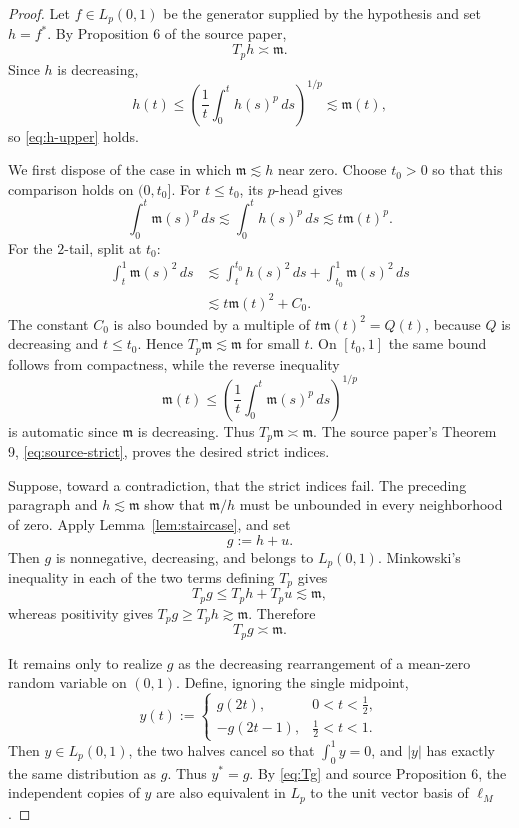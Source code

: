 \documentclass[11pt]{article}
\theoremstyle{definition}
\theoremstyle{remark}
\newcommand{\Tp}{T_p}
\newcommand{\mfun}{\mathfrak m}
\newcommand{\lesssimc}{\mathrel{\lesssim}}
\newcommand{\gtrsimc}{\mathrel{\gtrsim}}
\newcommand{\asympc}{\mathrel{\asymp}}
\newcommand{\Lp}{L_p(0,1)}
\begin{document}
\begin{proof}
Let $f\in\Lp$ be the generator supplied by the hypothesis and set $h=f^*$.
By Proposition 6 of the source paper,
\begin{equation}\label{eq:Th}
  \Tp h\asympc\mfun.
\end{equation}
Since $h$ is decreasing,
\[
  h(t)\leq
  \left(\frac1t\int_0^t h(s)^p\,ds\right)^{1/p}
  \lesssimc\mfun(t),
\]
so \eqref{eq:h-upper} holds.

We first dispose of the case in which $\mfun\lesssimc h$ near zero.  Choose
$t_0>0$ so that this comparison holds on $(0,t_0]$.  For $t\leq t_0$, its
$p$-head gives
\[
  \int_0^t\mfun(s)^p\,ds
  \lesssimc\int_0^t h(s)^p\,ds
  \lesssimc t\mfun(t)^p.
\]
For the $2$-tail, split at $t_0$:
\begin{align*}
  \int_t^1\mfun(s)^2\,ds
  &\lesssimc \int_t^{t_0}h(s)^2\,ds
    +\int_{t_0}^1\mfun(s)^2\,ds\\
  &\lesssimc t\mfun(t)^2+C_0.
\end{align*}
The constant $C_0$ is also bounded by a multiple of $t\mfun(t)^2=Q(t)$,
because $Q$ is decreasing and $t\leq t_0$.  Hence
$\Tp\mfun\lesssimc\mfun$ for small $t$.  On $[t_0,1]$ the same bound follows
from compactness, while the reverse inequality
\[
  \mfun(t)\leq
  \left(\frac1t\int_0^t\mfun(s)^p\,ds\right)^{1/p}
\]
is automatic since $\mfun$ is decreasing.  Thus
$\Tp\mfun\asympc\mfun$.  The source paper's Theorem 9,
\eqref{eq:source-strict}, proves the desired strict indices.

Suppose, toward a contradiction, that the strict indices fail.  The preceding
paragraph and $h\lesssimc\mfun$ show that $\mfun/h$ must be unbounded in every
neighborhood of zero.  Apply Lemma~\ref{lem:staircase}, and set
\[
  g:=h+u.
\]
Then $g$ is nonnegative, decreasing, and belongs to $L_p(0,1)$.  Minkowski's
inequality in each of the two terms defining $\Tp$ gives
\[
  \Tp g\leq\Tp h+\Tp u\lesssimc\mfun,
\]
whereas positivity gives $\Tp g\geq\Tp h\gtrsimc\mfun$.  Therefore
\begin{equation}\label{eq:Tg}
  \Tp g\asympc\mfun.
\end{equation}

It remains only to realize $g$ as the decreasing rearrangement of a mean-zero
random variable on $(0,1)$.  Define, ignoring the single midpoint,
\begin{equation}\label{eq:symmetrization}
  y(t):=
  \begin{cases}
    g(2t),&0<t<\tfrac12,\\
    -g(2t-1),&\tfrac12<t<1.
  \end{cases}
\end{equation}
Then $y\in L_p(0,1)$, the two halves cancel so that $\int_0^1y=0$, and
$|y|$ has exactly the same distribution as $g$.  Thus $y^*=g$.
By \eqref{eq:Tg} and source Proposition 6, the independent copies of $y$ are
also equivalent in $L_p$ to the unit vector basis of $\ell_M$.


\end{proof}
\end{document}
